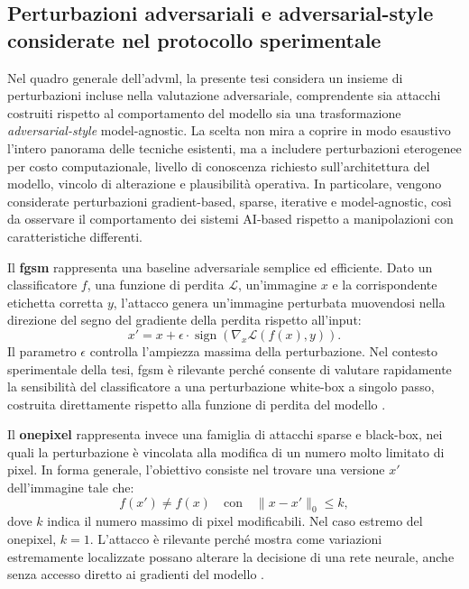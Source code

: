 \subsection{Perturbazioni adversariali e adversarial-style considerate nel protocollo sperimentale}
\label{subsec:background_attack_families}

Nel quadro generale dell'\gls{advml}, la presente tesi considera un insieme di perturbazioni incluse nella valutazione adversariale, comprendente sia attacchi costruiti rispetto al comportamento del modello sia una trasformazione \textit{adversarial-style} model-agnostic. La scelta non mira a coprire in modo esaustivo l'intero panorama delle tecniche esistenti, ma a includere perturbazioni eterogenee per costo computazionale, livello di conoscenza richiesto sull'architettura del modello, vincolo di alterazione e plausibilità operativa. In particolare, vengono considerate perturbazioni gradient-based, sparse, iterative e model-agnostic, così da osservare il comportamento dei sistemi AI-based rispetto a manipolazioni con caratteristiche differenti.


Il \textbf{\acrfull{fgsm}} rappresenta una baseline adversariale semplice ed efficiente.
Dato un classificatore \(f\), una funzione di perdita \(\mathcal{L}\), un'immagine
\(x\) e la corrispondente etichetta corretta \(y\), l'attacco genera un'immagine
perturbata muovendosi nella direzione del segno del gradiente della perdita
rispetto all'input:
\[
x' = x + \epsilon \cdot \operatorname{sign}
\left(\nabla_x \mathcal{L}(f(x), y)\right).
\]
Il parametro \(\epsilon\) controlla l'ampiezza massima della perturbazione. Nel
contesto sperimentale della tesi, \gls{fgsm} è rilevante perché consente di
valutare rapidamente la sensibilità del classificatore a una perturbazione
white-box a singolo passo, costruita direttamente rispetto alla funzione di
perdita del modello \cite{goodfellow2015explaining}.

Il \textbf{\gls{onepixel}} rappresenta invece una famiglia di attacchi sparse e
black-box, nei quali la perturbazione è vincolata alla modifica di un numero
molto limitato di pixel. In forma generale, l'obiettivo consiste nel trovare una
versione \(x'\) dell'immagine tale che:
\[
f(x') \neq f(x)
\quad \text{con} \quad
\|x - x'\|_0 \leq k,
\]
dove \(k\) indica il numero massimo di pixel modificabili. Nel caso estremo del
\gls{onepixel}, \(k=1\). L'attacco è rilevante perché mostra come variazioni
estremamente localizzate possano alterare la decisione di una rete neurale,
anche senza accesso diretto ai gradienti del modello \cite{su2019onepixel}.

